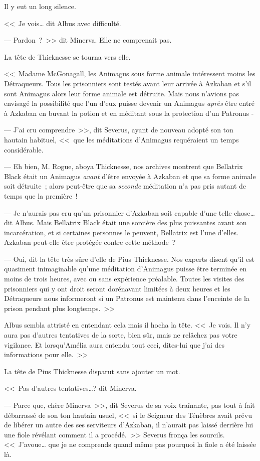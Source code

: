 Il y eut un long silence.

<<~Je vois… dit Albus avec difficulté.

--- Pardon~?~>> dit Minerva. Elle ne comprenait pas.

La tête de Thicknesse se tourna vers elle.

<<~Madame McGonagall, les Animagus sous forme animale intéressent moins les Détraqueurs. Tous les prisonniers sont testés avant leur arrivée à Azkaban et s'il sont Animagus alors leur forme animale est détruite. Mais nous n'avions pas envisagé la possibilité que l'un d'eux puisse devenir un Animagus \emph{après} être entré à Azkaban en buvant la potion et en méditant sous la protection d'un Patronus -

--- J'ai cru comprendre~>>, dit Severus, ayant de nouveau adopté son ton hautain habituel, <<~que les méditations d'Animagus requéraient un temps considérable.

--- Eh bien, M. Rogue, aboya Thicknesse, nos archives montrent que Bellatrix Black était un Animagus \emph{avant} d'être envoyée à Azkaban et que sa forme animale soit détruite~; alors peut-être que sa \emph{seconde} méditation n'a pas pris autant de temps que la première~!

--- Je n'aurais pas cru qu'un prisonnier d'Azkaban soit capable d'une telle chose… dit Albus. Mais Bellatrix Black était une sorcière des plus puissantes avant son incarcération, et si certaines personnes le peuvent, Bellatrix est l'une d'elles. Azkaban peut-elle être protégée contre cette méthode~?

--- Oui, dit la tête très sûre d'elle de Pius Thicknesse. Nos experts disent qu'il est quasiment inimaginable qu'une méditation d'Animagus puisse être terminée en moins de trois heures, avec ou sans expérience préalable. Toutes les visites des prisonniers qui y ont droit seront dorénavant limitées à deux heures et les Détraqueurs nous informeront si un Patronus est maintenu dans l'enceinte de la prison pendant plus longtemps.~>>

Albus sembla attristé en entendant cela mais il hocha la tête. <<~Je vois. Il n'y aura pas d'autres tentatives de la sorte, bien sûr, mais ne relâchez pas votre vigilance. Et lorsqu'Amélia aura entendu tout ceci, dites-lui que j'ai des informations pour elle.~>>

La tête de Pius Thicknesse disparut sans ajouter un mot.

<<~Pas d'autres tentatives…? dit Minerva.

--- Parce que, chère Minerva~>>, dit Severus de sa voix traînante, pas tout à fait débarrassé de son ton hautain usuel, <<~si le Seigneur des Ténèbres avait prévu de libérer un autre des ses serviteurs d'Azkaban, il n'aurait pas laissé derrière lui une fiole révélant comment il a procédé.~>> Severus fronça les sourcils. <<~J'avoue… que je ne comprends quand même pas pourquoi la fiole a été laissée là.

